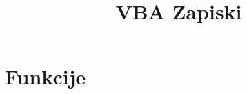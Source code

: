 \documentclass[a4paper, 11pt]{article}
\title{VBA Zapiski}
\date{}
\author{}
\begin{document}
	\maketitle
	
	\section*{Funkcije}
\end{document}
